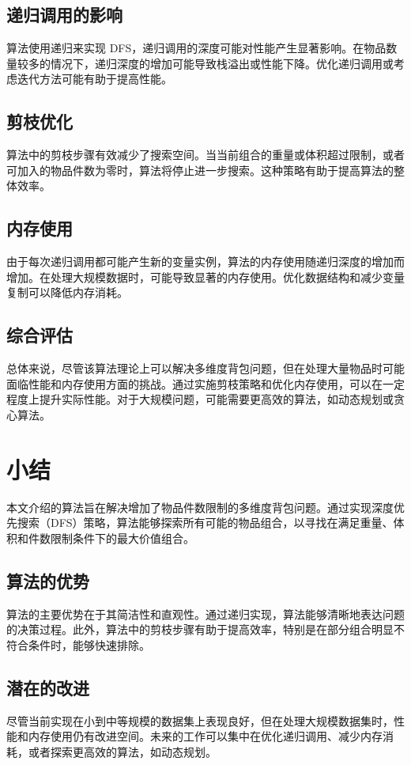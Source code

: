 \documentclass[12pt]{article}
\begin{document}
\subsection{递归调用的影响}
算法使用递归来实现 DFS，递归调用的深度可能对性能产生显著影响。在物品数量较多的情况下，递归深度的增加可能导致栈溢出或性能下降。优化递归调用或考虑迭代方法可能有助于提高性能。

\subsection{剪枝优化}
算法中的剪枝步骤有效减少了搜索空间。当当前组合的重量或体积超过限制，或者可加入的物品件数为零时，算法将停止进一步搜索。这种策略有助于提高算法的整体效率。

\subsection{内存使用}
由于每次递归调用都可能产生新的变量实例，算法的内存使用随递归深度的增加而增加。在处理大规模数据时，可能导致显著的内存使用。优化数据结构和减少变量复制可以降低内存消耗。

\subsection{综合评估}
总体来说，尽管该算法理论上可以解决多维度背包问题，但在处理大量物品时可能面临性能和内存使用方面的挑战。通过实施剪枝策略和优化内存使用，可以在一定程度上提升实际性能。对于大规模问题，可能需要更高效的算法，如动态规划或贪心算法。

\newpage

\section{小结}

本文介绍的算法旨在解决增加了物品件数限制的多维度背包问题。通过实现深度优先搜索（DFS）策略，算法能够探索所有可能的物品组合，以寻找在满足重量、体积和件数限制条件下的最大价值组合。

\subsection{算法的优势}
算法的主要优势在于其简洁性和直观性。通过递归实现，算法能够清晰地表达问题的决策过程。此外，算法中的剪枝步骤有助于提高效率，特别是在部分组合明显不符合条件时，能够快速排除。

\subsection{潜在的改进}
尽管当前实现在小到中等规模的数据集上表现良好，但在处理大规模数据集时，性能和内存使用仍有改进空间。未来的工作可以集中在优化递归调用、减少内存消耗，或者探索更高效的算法，如动态规划。
\end{document}
